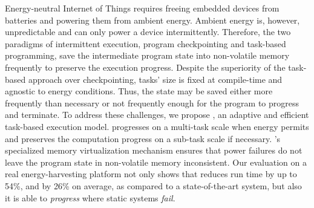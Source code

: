 Energy-neutral Internet of Things requires freeing embedded devices from batteries and powering them from ambient energy. Ambient energy is, however, unpredictable and can only power a device intermittently. Therefore, the two paradigms of intermittent execution, program checkpointing and task-based programming, save the intermediate program state into non-volatile memory frequently to preserve the execution progress. Despite the superiority of the task-based approach over checkpointing, tasks' size is fixed at compile-time and agnostic to energy conditions. Thus, the state may be saved either more frequently than necessary or not frequently enough for the program to progress and terminate. To address these challenges, we propose \sys, an adaptive and efficient task-based execution model. \sys progresses on a multi-task scale when energy permits and preserves the computation progress on a sub-task scale if necessary. \sys's specialized memory virtualization mechanism ensures that power failures do not leave the program state in non-volatile memory inconsistent. Our evaluation on a real energy-harvesting platform not only shows that \sys reduces run time by up to 54\%, and by 26\% on average, as compared to a state-of-the-art system, but also it is able to \emph{progress} where static systems \emph{fail}.